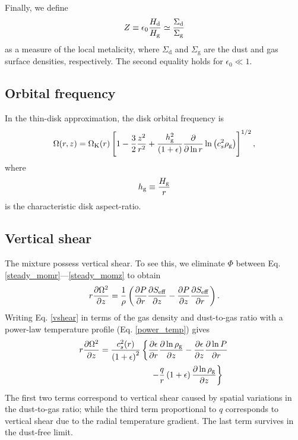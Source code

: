 Finally, we define 
\begin{align}
  Z \equiv \epsilon_0\frac{H_\mathrm{d}}{H_\mathrm{g}} \simeq
  \frac{\Sigma_\mathrm{d}}{\Sigma_\mathrm{g}} 
\end{align}
as a measure of the local metalicity, where $\Sigma_\mathrm{d}$ and
$\Sigma_\mathrm{g}$ are the dust and gas surface densities,
respectively. The second equality holds for $\epsilon_0\ll1$.  


\subsection{Orbital frequency} 
In the thin-disk approximation, the disk orbital frequency is 
\begin{align}
  \Omega(r,z) = \Omega_{\rm K}(r)\left[1 - \frac{3}{2}\frac{z^2}{r^2} +
    \frac{h_\mathrm{g}^2}{\left(1+\epsilon\right)}\frac{\partial}{\partial\ln{r}}\ln{\left(c_s^2\rho_\mathrm{g}\right)}
    \right]^{1/2}, 
\end{align}
where 
\begin{align}
  h_\mathrm{g} \equiv \frac{H_\mathrm{g}}{r}
\end{align}
is the characteristic disk aspect-ratio. 

\subsection{Vertical shear}\label{vertshear}
The mixture possess vertical shear. To see this, we eliminate $\Phi$
between Eq. \ref{steady_momr}---\ref{steady_momz} to 
obtain 
\begin{align}\label{vshear}
  r\frac{\partial \Omega^2}{\partial z} 
   = \frac{1}{\rho}\left(\frac{\partial P}{\partial r}\frac{\partial S_\mathrm{eff}}{\partial z} -\frac{\partial
    P}{\partial z}\frac{\partial S_\mathrm{eff}}{\partial r} \right). 
\end{align}
Writing Eq. \ref{vshear} in terms of the gas density and dust-to-gas
ratio with a power-law temperature profile (Eq. \ref{power_temp}) gives 
\begin{align}\label{vshear2}
  &r\frac{\p \Omega^2}{\p z}  =
  \frac{c_s^2(r)}{\left(1+\epsilon\right)^2}\left\{
  \frac{\p\epsilon}{\p r}\frac{\p\ln{\rhog}}{\p z}
 -\frac{\p\epsilon}{\p z}\frac{\p\ln{P}}{\p r}\right.\notag\\
  &\phantom{ r\frac{\p \Omega^2}{\p z}  =
    \frac{c_s^2(r)}{\left(1+\epsilon\right)^2}\left\{\right\} }
  \left. -\frac{q}{r} \left(1+\epsilon\right)\frac{\p\ln{\rhog}}{\p z} \right\} 
\end{align}
The first two terms correspond to vertical shear caused by spatial
variations in the dust-to-gas ratio; while the third term
proportional to $q$ corresponds to vertical shear due to the 
radial temperature gradient. The last term survives in the dust-free
limit. 

